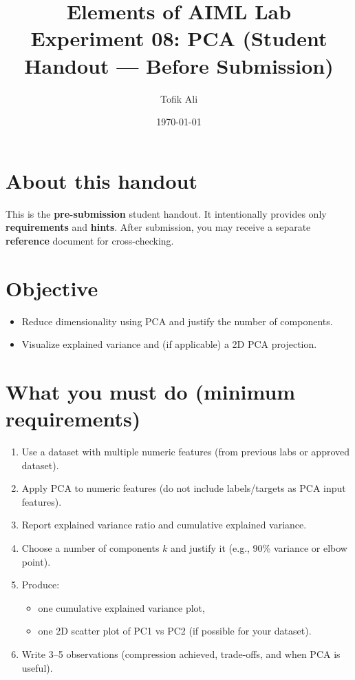 \documentclass[11pt]{article}
\title{Elements of AIML Lab\\Experiment 08: PCA (Student Handout — Before Submission)}
\author{Tofik Ali}
\date{\today}
\begin{document}
\maketitle
\tableofcontents

\section{About this handout}
This is the \textbf{pre-submission} student handout.
It intentionally provides only \textbf{requirements} and \textbf{hints}.
After submission, you may receive a separate \textbf{reference} document for cross-checking.

\section{Objective}
\begin{itemize}[leftmargin=*]
  \item Reduce dimensionality using PCA and justify the number of components.
  \item Visualize explained variance and (if applicable) a 2D PCA projection.
\end{itemize}

\section{What you must do (minimum requirements)}
\begin{enumerate}[leftmargin=*]
  \item Use a dataset with multiple numeric features (from previous labs or approved dataset).
  \item Apply PCA to numeric features (do not include labels/targets as PCA input features).
  \item Report explained variance ratio and cumulative explained variance.
  \item Choose a number of components $k$ and justify it (e.g., 90\% variance or elbow point).
  \item Produce:
  \begin{itemize}[leftmargin=*]
    \item one cumulative explained variance plot,
    \item one 2D scatter plot of PC1 vs PC2 (if possible for your dataset).
  \end{itemize}
  \item Write 3--5 observations (compression achieved, trade-offs, and when PCA is useful).
\end{enumerate}
\end{document}
